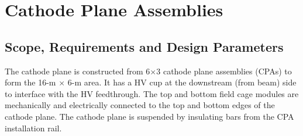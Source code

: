 


\section{Cathode Plane Assemblies}


\subsection{Scope, Requirements and Design Parameters}

The cathode plane is constructed from 6$\times$3 cathode plane assemblies (CPAs) to form the 16-m $\times$ 6-m area.  It has a HV cup at the %
downstream (from beam) side to interface with the HV feedthrough. The top and bottom field cage modules are mechanically and electrically connected to the top and bottom edges of the cathode plane.  The cathode plane is suspended %
by insulating bars %
from the CPA installation rail.


